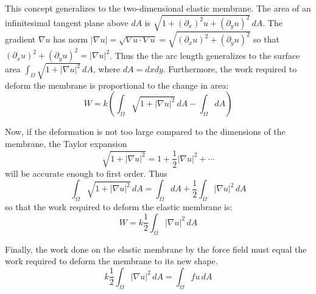 \documentclass[a4paper]{report}
\begin{document}
This concept generalizes to the two-dimensional elastic membrane. 
The area of an infinitesimal tangent plane above $dA$ is $\sqrt{1 + (\partial_x)^2 u + (\partial_y u)^2}   \,dA$.  The gradient $\nabla u$ has norm $|\nabla u| = \sqrt{\nabla u \cdot \nabla u} = \sqrt{(\partial_x u)^2 + (\partial_y u)^2} $ so that $(\partial_x u)^2 + (\partial_y u)^2 = |\nabla u|^2  $. 
 Thus the the arc length generalizes to the surface area $ \int_{\Omega} \sqrt{1 + |\nabla u| ^2} \, dA$, where $dA = dxdy$.  Furthermore, the work required to deform the membrane is proportional to the change in area:
\begin{equation}
W = k \left(  \int_{\Omega} \sqrt{1 + |\nabla u| ^2} \, dA    - \int_{\Omega} dA  \right)
\end{equation}

Now, if the deformation is not too large compared to the dimensions of the membrane, the Taylor expansion
\begin{equation}
 \sqrt{1 + |\nabla u| ^2}  = 1 + \frac{1}{2}|\nabla u|^2 + \cdots
\end{equation}
will be accurate enough to first order.  Thus
\begin{equation}
\int_{\Omega} \sqrt{1 + |\nabla u| ^2} \, dA = \int_{\Omega} dA + \frac{1}{2} \int_{\Omega} |\nabla u|^2 \,dA
\end{equation}
so that the work required to deform the elastic membrane is:
\begin{equation}
W = k \frac{1}{2} \int_{\Omega} |\nabla u|^2 \,dA
\end{equation}

Finally, the work done on the elastic membrane by the force field must equal the work required to deform the membrane to its new shape.
\begin{equation}
k \frac{1}{2} \int_{\Omega} |\nabla u|^2 \,dA = \int_{\Omega} f u \,dA
\end{equation}

\end{document}
